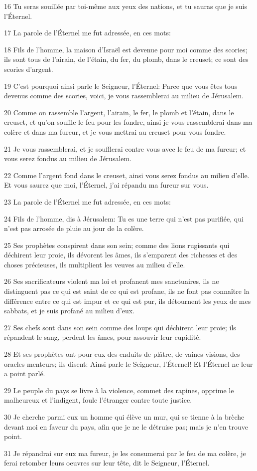 \par 16 Tu seras souillée par toi-même aux yeux des nations, et tu sauras que je suis l'Éternel.
\par 17 La parole de l'Éternel me fut adressée, en ces mots:
\par 18 Fils de l'homme, la maison d'Israël est devenue pour moi comme des scories; ils sont tous de l'airain, de l'étain, du fer, du plomb, dans le creuset; ce sont des scories d'argent.
\par 19 C'est pourquoi ainsi parle le Seigneur, l'Éternel: Parce que vous êtes tous devenus comme des scories, voici, je vous rassemblerai au milieu de Jérusalem.
\par 20 Comme on rassemble l'argent, l'airain, le fer, le plomb et l'étain, dans le creuset, et qu'on souffle le feu pour les fondre, ainsi je vous rassemblerai dans ma colère et dans ma fureur, et je vous mettrai au creuset pour vous fondre.
\par 21 Je vous rassemblerai, et je soufflerai contre vous avec le feu de ma fureur; et vous serez fondus au milieu de Jérusalem.
\par 22 Comme l'argent fond dans le creuset, ainsi vous serez fondus au milieu d'elle. Et vous saurez que moi, l'Éternel, j'ai répandu ma fureur sur vous.
\par 23 La parole de l'Éternel me fut adressée, en ces mots:
\par 24 Fils de l'homme, dis à Jérusalem: Tu es une terre qui n'est pas purifiée, qui n'est pas arrosée de pluie au jour de la colère.
\par 25 Ses prophètes conspirent dans son sein; comme des lions rugissants qui déchirent leur proie, ils dévorent les âmes, ils s'emparent des richesses et des choses précieuses, ils multiplient les veuves au milieu d'elle.
\par 26 Ses sacrificateurs violent ma loi et profanent mes sanctuaires, ils ne distinguent pas ce qui est saint de ce qui est profane, ils ne font pas connaître la différence entre ce qui est impur et ce qui est pur, ils détournent les yeux de mes sabbats, et je suis profané au milieu d'eux.
\par 27 Ses chefs sont dans son sein comme des loups qui déchirent leur proie; ils répandent le sang, perdent les âmes, pour assouvir leur cupidité.
\par 28 Et ses prophètes ont pour eux des enduits de plâtre, de vaines visions, des oracles menteurs; ils disent: Ainsi parle le Seigneur, l'Éternel! Et l'Éternel ne leur a point parlé.
\par 29 Le peuple du pays se livre à la violence, commet des rapines, opprime le malheureux et l'indigent, foule l'étranger contre toute justice.
\par 30 Je cherche parmi eux un homme qui élève un mur, qui se tienne à la brèche devant moi en faveur du pays, afin que je ne le détruise pas; mais je n'en trouve point.
\par 31 Je répandrai sur eux ma fureur, je les consumerai par le feu de ma colère, je ferai retomber leurs oeuvres sur leur tête, dit le Seigneur, l'Éternel.

